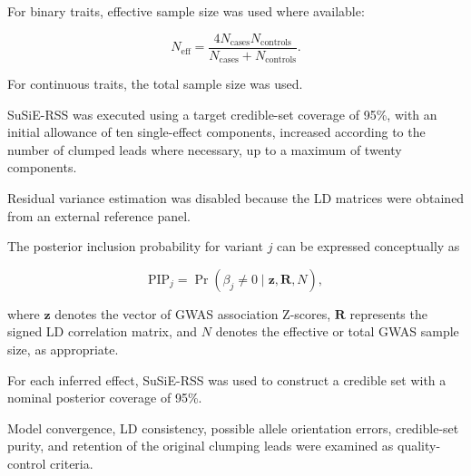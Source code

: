 \documentclass[11pt,a4paper]{article}
\begin{document}
For binary traits, effective sample size was used where
available:

\begin{equation}
N_{\mathrm{eff}} =
\frac{4N_{\mathrm{cases}}N_{\mathrm{controls}}}
{N_{\mathrm{cases}}+N_{\mathrm{controls}}}.
\end{equation}

For continuous traits, the total sample size was used.

SuSiE-RSS was executed using a target credible-set
coverage of 95\%, with an initial allowance of ten
single-effect components, increased according to the
number of clumped leads where necessary, up to
a maximum of twenty components.

Residual variance estimation was disabled because
the LD matrices were obtained from an external
reference panel.

The posterior inclusion probability for variant $j$
can be expressed conceptually as

\begin{equation}
\mathrm{PIP}_{j}
=
\Pr\left(
\beta_j \neq 0
\mid
\mathbf{z},\mathbf{R},N
\right),
\end{equation}

where $\mathbf{z}$ denotes the vector of GWAS
association Z-scores, $\mathbf{R}$ represents the
signed LD correlation matrix, and $N$ denotes the
effective or total GWAS sample size, as appropriate.

For each inferred effect, SuSiE-RSS was used to construct
a credible set with a nominal posterior coverage
of 95\%.

Model convergence, LD consistency, possible allele
orientation errors, credible-set purity, and retention
of the original clumping leads were examined as
quality-control criteria.

\end{document}
